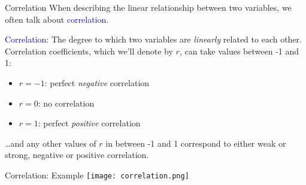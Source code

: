 \documentclass[10pt,t]{beamer}
\begin{document}
\begin{frame}{Correlation}
When describing the linear relationship between two variables, we often talk about \textcolor{blue}{correlation}. 

\vspace{0.3cm}

\textcolor{blue}{Correlation}: The degree to which two variables are \textit{linearly} related to each other. Correlation coefficients, which we'll denote by $r$, can take values between -1 and 1:

\vspace{0.3cm} \pause
\begin{itemize}
	\item $r = -1$: perfect \textit{negative} correlation
	\item $r = 0$: no correlation
	\item $r = 1$: perfect \textit{positive} correlation
\end{itemize}

\vspace{0.3cm} \dots and any other values of $r$ in between -1 and 1 correspond to either weak or strong, negative or positive correlation.


\end{frame}

\begin{frame}{Correlation: Example}
	\centering \texttt{[image: correlation.png]}
\end{frame}
\end{document}
